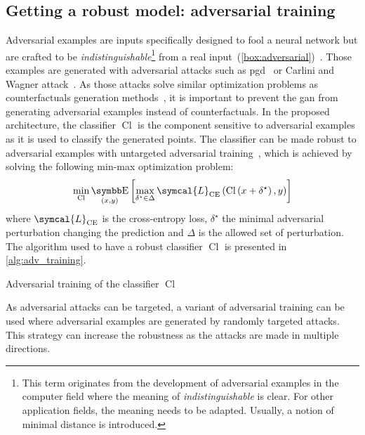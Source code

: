 \documentclass[../main.tex]{subfiles}
\begin{document}
	\subsection{Getting a robust model: adversarial training}
		Adversarial examples are inputs specifically designed to fool a neural network but are crafted to be \textit{indistinguishable}\footnote{This term originates from the development of adversarial examples in the computer field where the meaning of \textit{indistinguishable} is clear. For other application fields, the meaning needs to be adapted.
			Usually, a notion of minimal distance is introduced.} from a real input~(\cref{box:adversarial})~\cite{Szegedy2013IntriguingPO}.
		Those examples are generated with adversarial attacks such as \gls{pgd}~\cite{PGDAttacks2} or Carlini and Wagner attack~\cite{Carlini2016TowardsET}.
		As those attacks solve similar optimization problems as counterfactuals generation methods~\cite{Pawelczyk2021ExploringCE,Freiesleben2021}, it is important to prevent the \gls{gan} from generating adversarial examples instead of counterfactuals.
		In the proposed architecture, the classifier \(\operatorname{Cl}\) is the component sensitive to adversarial examples as it is used to classify the generated points.
		The classifier can be made robust to adversarial examples with untargeted adversarial training~\cite{AdvTrainingMinMax}, which is achieved by solving the following min-max optimization problem:
		\begin{equation}
			\min_{\operatorname{Cl}} \E_{(x,y)}\left[\max_{\delta^{\star} \in \Delta} \symcal{L}_{\text{CE}}\left(\operatorname{Cl}\left(x+\delta^{\star}\right), y \right)  \right]
		\end{equation}
		where \(\symcal{L}_{\text{CE}}\) is the cross-entropy loss, \(\delta^{\star}\) the minimal adversarial perturbation changing the prediction and \(\Delta\) is the allowed set of perturbation.
		The algorithm used to have a robust classifier \(\operatorname{Cl}\) is presented in \cref{alg:adv_training}.
		\begin{algorithm}[htbp]
			\DontPrintSemicolon
			\caption{Adversarial training of the classifier \(\operatorname{Cl}\)}\label{alg:adv_training}
		\end{algorithm}
		As adversarial attacks can be targeted, a variant of adversarial training can be used where adversarial examples are generated by randomly targeted attacks.
		This strategy can increase the robustness as the attacks are made in multiple directions.
\end{document}
